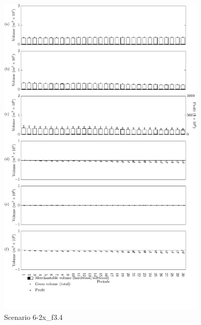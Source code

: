 \begin{figure}[h]
  \centering
  \includegraphics[width=10cm]{images/appendix/s6-2x_test40}
  \caption{Scenario 6-2x\_f3.4}
  \label{fig:s6-2x_test40}
\end{figure}

